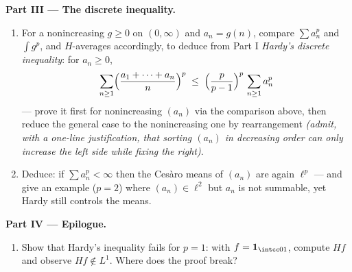 \begin{problem}
\medskip
\noindent\textbf{Part III --- The discrete inequality.}
\begin{enumerate}[resume]
  \item For a nonincreasing $g \geq 0$ on $(0,\infty)$ and
        $a_n = g(n)$, compare $\sum a_n^p$ and $\int g^p$,
        and $H$-averages accordingly, to deduce from Part I
        \emph{Hardy's discrete inequality}: for $a_n \geq 0$,
        \[
        \sum_{n\geq1}\Bigl(\frac{a_1 + \dots +
        a_n}{n}\Bigr)^{p}
        \;\leq\;
        \Bigl(\frac{p}{p-1}\Bigr)^{p}\,\sum_{n\geq1}a_n^p
        \]
        --- prove it first for nonincreasing $(a_n)$ via the
        comparison above, then reduce the general case to the
        nonincreasing one by rearrangement \emph{(admit, with
        a one-line justification, that sorting $(a_n)$ in
        decreasing order can only increase the left side while
        fixing the right)}.
  \item Deduce: if $\sum a_n^p < \infty$ then the Ces\`aro
        means of $(a_n)$ are again $\ell^p$ --- and give an
        example ($p = 2$) where $(a_n) \in \ell^2$ but $a_n$
        is not summable, yet Hardy still controls the means.
\end{enumerate}

\medskip
\noindent\textbf{Part IV --- Epilogue.}
\begin{enumerate}[resume]
  \item Show that Hardy's inequality fails for $p = 1$: with
        $f = \mathbf 1_{\intcc01}$, compute $Hf$ and observe
        $Hf \notin L^1$. Where does the proof break?
\end{enumerate}


\end{problem}
